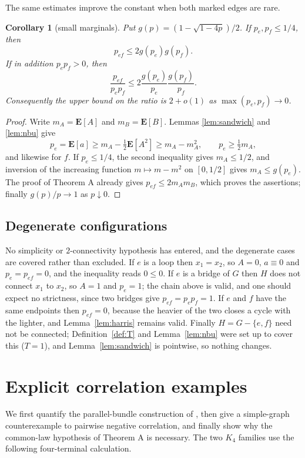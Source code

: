 \documentclass[10pt,a4paper]{amsart}
\newtheorem{corollary}[theorem]{Corollary}
\newcommand{\E}{\mathbf{E}}
\begin{document}
The same estimates improve the constant when both marked edges are rare.

\begin{corollary}[small marginals]
\label{cor:small-marginals}
Put $g(p)=(1-\sqrt{1-4p})/2$. If $p_e,p_f\le1/4$, then
\[
p_{ef}\le 2g(p_e)g(p_f).
\]
If in addition $p_ep_f>0$, then
\[
\frac{p_{ef}}{p_ep_f}\le
2\frac{g(p_e)}{p_e}\frac{g(p_f)}{p_f}.
\]
Consequently the upper bound on the ratio is $2+o(1)$ as
$\max(p_e,p_f)\to0$.
\end{corollary}

\begin{proof}
Write $m_A=\E[A]$ and $m_B=\E[B]$. Lemmas \ref{lem:sandwich} and
\ref{lem:nbu} give
\[
p_e=\E[a]\ge m_A-\tfrac12\E[A^2]\ge m_A-m_A^2,
\qquad p_e\ge\tfrac12m_A,
\]
and likewise for $f$. If $p_e\le1/4$, the second inequality gives
$m_A\le1/2$, and inversion of the increasing function $m\mapsto m-m^2$ on
$[0,1/2]$ gives $m_A\le g(p_e)$. The proof of Theorem A already gives
$p_{ef}\le2m_Am_B$, which proves the assertions; finally $g(p)/p\to1$ as
$p\downarrow0$.
\end{proof}

\subsection{Degenerate configurations}
\label{sec:degenerate}

No simplicity or $2$-connectivity hypothesis has entered, and the degenerate
cases are covered rather than excluded. If $e$ is a loop then $x_1=x_2$, so
$A=0$, $a\equiv0$ and $p_e=p_{ef}=0$, and the inequality reads $0\le0$. If $e$
is a bridge of $G$ then $H$ does not connect $x_1$ to $x_2$, so $A=1$ and
$p_e=1$; the chain above is valid, and one should expect no strictness, since
two bridges give $p_{ef}=p_ep_f=1$. If $e$ and $f$ have the same endpoints then
$p_{ef}=0$, because the heavier of the two closes a cycle with the lighter, and
Lemma~\ref{lem:harris} remains valid. Finally $H=G-\{e,f\}$ need not be
connected; Definition~\ref{def:T} and Lemma~\ref{lem:nbu} were set up to cover
this ($T=1$), and Lemma~\ref{lem:sandwich} is pointwise, so nothing changes.

\section{Explicit correlation examples}
\label{sec:k4}

We first quantify the parallel-bundle construction of \cite{LPS}, then give a
simple-graph counterexample to pairwise negative correlation, and finally show
why the common-law hypothesis of Theorem A is necessary. The two $K_4$
families use the following four-terminal calculation.
\end{document}
